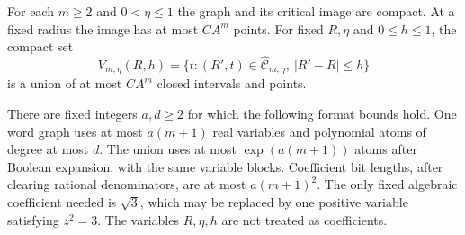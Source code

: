 \begin{lemma}
\label{lem:v63-graph-format}
For each $m\ge2$ and $0<\eta\le1$ the graph and its critical image
are compact. At a fixed radius the image has at most $CA^m$ points.
For fixed $R,\eta$ and $0\le h\le1$, the compact set
\begin{equation}\label{eq:v63-horizontal-image}
 V_{m,\eta}(R,h)
 =\{t:(R',t)\in\widehat{\mathcal C}_{m,\eta},\ |R'-R|\le h\}
\end{equation}
is a union of at most $CA^m$ closed intervals and points.

There are fixed integers $a,d\ge2$ for which the following format
bounds hold. One word graph uses at most $a(m+1)$ real variables and
polynomial atoms of degree at most $d$. The union uses at most
$\exp(a(m+1))$ atoms after Boolean expansion, with the same variable
blocks. Coefficient bit lengths, after clearing rational denominators,
are at most $a(m+1)^2$. The only fixed algebraic coefficient needed is
$\sqrt3$, which may be replaced by one positive variable satisfying
$z^2=3$. The variables $R,\eta,h$ are not treated as coefficients.
\end{lemma}
